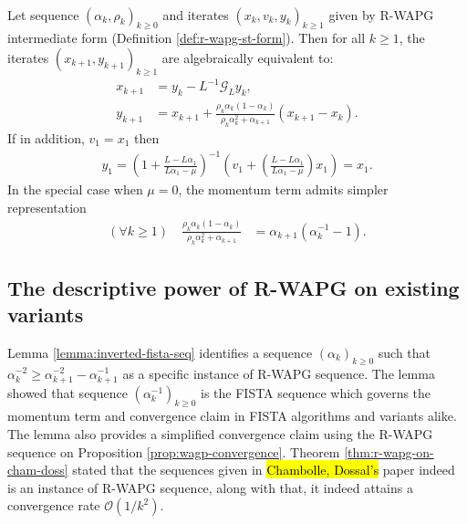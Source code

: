 \documentclass[12pt]{article}
\begin{document}
        \begin{proposition}\label{prop:r-wapg-momentum-repr}
            \;\\
            Let sequence $(\alpha_k, \rho_k)_{k \ge 0}$ and iterates $(x_k, v_k, y_k)_{k\ge 1}$ given by R-WAPG intermediate form (Definition \ref{def:r-wapg-st-form}). 
            Then for all $k \ge 1$, the iterates $(x_{k + 1}, y_{k + 1})_{k \ge 1}$ are algebraically equivalent to: 
            \begin{align*}
                x_{k + 1} &= y_k - L^{-1}\mathcal G_Ly_k, 
                \\
                y_{k + 1} &= 
                x_{k + 1} + 
                \frac{\rho_k\alpha_k(1 - \alpha_k)}
                {\rho_k\alpha_k^2 + \alpha_{k + 1}}(x_{k + 1} - x_k). 
            \end{align*}
            If in addition, $v_1 = x_1$ then 
            \begin{align*}
                y_1 = \left(
                    1 + \frac{L - L \alpha_1}{L\alpha_1 - \mu}
                \right)^{-1}\left(
                    v_1 + \left(
                        \frac{L - L \alpha_1}{L \alpha_1 - \mu}
                    \right)x_1
                \right) = x_1. 
            \end{align*}
            In the special case when $\mu = 0$, the momentum term admits simpler representation 
            \begin{align*}
                (\forall k \ge 1) \quad 
                \frac{\rho_k\alpha_k(1 - \alpha_k)}{\rho_k\alpha_k^2 + \alpha_{k + 1}}
                & = \alpha_{k + 1}(\alpha_k^{-1} - 1). 
            \end{align*}
        \end{proposition}

    \subsection{The descriptive power of R-WAPG on existing variants}\label{ssec:describe-variants-with-rwapg}
        Lemma \ref{lemma:inverted-fista-seq} identifies a sequence $(\alpha_k)_{k \ge 0}$ such that $\alpha_k^{-2} \ge \alpha_{k + 1}^{-2} - \alpha_{k + 1}^{-1}$ as a specific instance of R-WAPG sequence. 
        The lemma showed that sequence $(\alpha_k^{-1})_{k \ge 0}$ is the FISTA sequence which governs the momentum term and convergence claim in FISTA algorithms and variants alike. 
        The lemma also provides a simplified convergence claim using the R-WAPG sequence on Proposition \ref{prop:wagp-convergence}. 
        Theorem \ref{thm:r-wapg-on-cham-doss} stated that the sequences given in  
        {\hl{Chambolle, Dossal's}}
        paper \cite{chambolle_convergence_2015} indeed is an instance of R-WAPG sequence, along with that, it indeed attains a convergence rate $\mathcal O(1/k^2)$. 
        \par 
        
\end{document}
